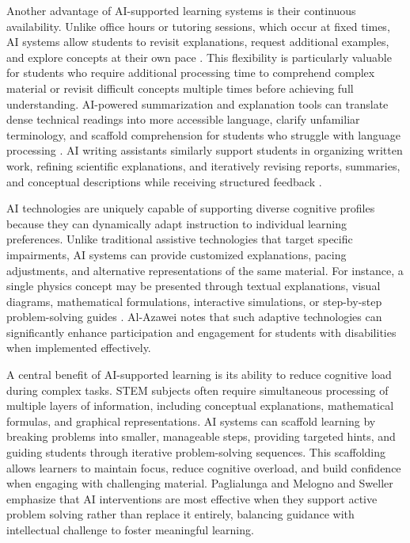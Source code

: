 \documentclass[]{aastex701}
\begin{document}
Another advantage of AI-supported learning systems is their continuous availability. Unlike office hours or tutoring sessions, which occur at fixed times, AI systems allow students to revisit explanations, request additional examples, and explore concepts at their own pace \citep{Khowaja2025}. This flexibility is particularly valuable for students who require additional processing time to comprehend complex material or revisit difficult concepts multiple times before achieving full understanding. AI-powered summarization and explanation tools can translate dense technical readings into more accessible language, clarify unfamiliar terminology, and scaffold comprehension for students who struggle with language processing \citep{Voultsiou2025, HarkinsBrown2025}. AI writing assistants similarly support students in organizing written work, refining scientific explanations, and iteratively revising reports, summaries, and conceptual descriptions while receiving structured feedback \citep{Voultsiou2025, HarkinsBrown2025}.

AI technologies are uniquely capable of supporting diverse cognitive profiles because they can dynamically adapt instruction to individual learning preferences. Unlike traditional assistive technologies that target specific impairments, AI systems can provide customized explanations, pacing adjustments, and alternative representations of the same material. For instance, a single physics concept may be presented through textual explanations, visual diagrams, mathematical formulations, interactive simulations, or step-by-step problem-solving guides \citep{Voultsiou2025, Khowaja2025}. Al-Azawei \citep{AlAzawei2023} notes that such adaptive technologies can significantly enhance participation and engagement for students with disabilities when implemented effectively.

A central benefit of AI-supported learning is its ability to reduce cognitive load during complex tasks. STEM subjects often require simultaneous processing of multiple layers of information, including conceptual explanations, mathematical formulas, and graphical representations. AI systems can scaffold learning by breaking problems into smaller, manageable steps, providing targeted hints, and guiding students through iterative problem-solving sequences. This scaffolding allows learners to maintain focus, reduce cognitive overload, and build confidence when engaging with challenging material. Paglialunga and Melogno \citep{Paglialunga2025} and Sweller \citep{Sweller2011} emphasize that AI interventions are most effective when they support active problem solving rather than replace it entirely, balancing guidance with intellectual challenge to foster meaningful learning.
\end{document}
